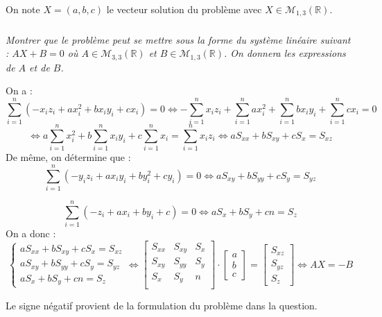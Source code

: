 \documentclass[10pt,fleqn]{article} %
\begin{document}

On note $X=(a,b,c)$ le vecteur solution du problème avec $X\in \mathcal{M}_{1,3} \left(\mathbb{R} \right)$.


\subparagraph{}
\textit{Montrer que le problème peut se mettre sous la forme du système linéaire suivant : $AX + B = 0$  où $A \in \mathcal{M}_{3,3} \left(\mathbb{R} \right)$ et  $B \in \mathcal{M}_{1,3} \left(\mathbb{R} \right)$. On donnera les expressions de $A$ et de $B$.}

\ifprof
\begin{corrige}
On a : 
$$
\sum\limits_{i=1}^{n}   \left(-x_iz_i +ax_i^2 +bx_i y_i +cx_i\right) = 0 
\Leftrightarrow    - \sum\limits_{i=1}^{n} x_iz_i +\sum\limits_{i=1}^{n}ax_i^2 +\sum\limits_{i=1}^{n}bx_i y_i +\sum\limits_{i=1}^{n}cx_i  = 0 
$$
$$
\Leftrightarrow    a\sum\limits_{i=1}^{n}x_i^2 +b\sum\limits_{i=1}^{n}x_i y_i +c\sum\limits_{i=1}^{n}x_i  = \sum\limits_{i=1}^{n} x_iz_i
\Leftrightarrow    aS_{xx} +bS_{xy} +cS_x  =S_{xz}
$$
De même, on détermine que : 
$$
\sum\limits_{i=1}^{n}     \left(-y_iz_i + ax_i y_i  +by_i^2 +cy_i\right)  = 0
\Leftrightarrow aS_{xy} + bS_{yy}+cS_y = S_{yz}
$$

$$
\sum\limits_{i=1}^{n}  \left(-z_i +ax_i +by_i +c\right) = 0
\Leftrightarrow aS_{x} + bS_{y}+cn = S_{z}
$$
On a donc : 
$$
\left\{
\begin{array}{l}
aS_{xx} +bS_{xy} +cS_x  =S_{xz} \\
aS_{xy} + bS_{yy}+cS_y = S_{yz} \\
aS_{x} + bS_{y}+cn = S_{z}
\end{array}
\right.
\Leftrightarrow
\left[ 
\begin{array}{ccc}
S_{xx} & S_{xy} & S_x \\
S_{xy} & S_{yy} & S_y \\
S_{x} & S_{y} & n \\
\end{array}
\right]
\cdot 
\left[ 
\begin{array}{c}
a \\b \\ c\end{array}
\right]
=
\left[ 
\begin{array}{c}
S_{xz} \\
S_{yz} \\ 
S_{z}\end{array}
\right]
\Leftrightarrow
AX = -B
$$

Le signe négatif provient de la formulation du problème dans la question. 

\end{corrige}
\end{document}
